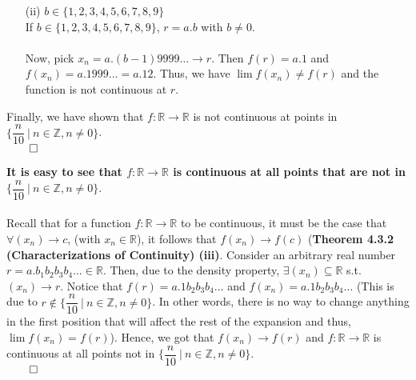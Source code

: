\documentclass[11pt]{article}
\newcommand{\reals}{\mathbb{R}}
\newcommand{\ints}{\mathbb{Z}}
\begin{document}
\begin{itemize}
\begin{itemize}
            \item[(ii)]
                $b \in \{1, 2, 3, 4, 5, 6, 7, 8, 9\}$
                \\
                If $b \in \{1, 2, 3, 4, 5, 6, 7, 8, 9\}$, $r = a.b$ with $b
                \neq 0$.
                \\
                \\
                Now, pick $x_n = a.(b - 1)9999\dots \to r$. Then $f(r) = a.1$
                and $f(x_n) = a.1999\dots = a.12$. Thus, we have $\lim{f(x_n)}
                \neq f(r)$ and the function is not continuous at $r$.
        \end{itemize}

        Finally, we have shown that $f : \reals \to \reals$ is not continuous
        at points in $\Big\{\dfrac{n}{10} \ \big| \ n \in \ints, n \neq 0
        \Big\}$.\\
        $\qed$

        \textbf{It is easy to see that $f : \reals \to \reals$ is continuous at
        all points that are not in $\Big\{\dfrac{n}{10} \ \big| \ n \in \ints,
        n \neq 0 \Big\}$}.
        \\
        \\
        Recall that for a function $f : \reals \to \reals$ to be continuous, it
        must be the case that $\forall (x_n) \to c$, (with $x_n \in \reals$),
        it follows that $f(x_n) \to f(c)$ (\textbf{Theorem 4.3.2
        (Characterizations of Continuity) (iii)}. Consider an arbitrary real
        number $r = a.b_1b_2b_3b_4\dots \in \reals$. Then, due to the density
        property, $\exists (x_n) \subseteq \reals$ s.t. $(x_n) \to r$. Notice
        that $f(r) = a.1b_2b_3b_4\dots$ and $f(x_n) = a.1b_2b_3b_4\dots$ (This
        is due to $r \notin \Big\{\dfrac{n}{10} \ \big| \ n \in \ints, n \neq 0
        \Big\}$. In other words, there is no way to change anything in the
        first position that will affect the rest of the expansion and thus,
        $\lim{f(x_n)} = f(r)$). Hence, we got that $f(x_n) \to f(r)$ and $f :
        \reals \to \reals$ is continuous at all points not in
        $\Big\{\dfrac{n}{10} \ \big| \ n \in \ints, n \neq 0 \Big\}$.\\
        $\qed$


\end{itemize}
\end{document}
